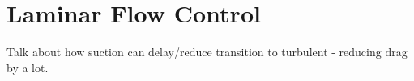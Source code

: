 \section{Laminar Flow Control}

Talk about how suction can delay/reduce transition to turbulent - reducing drag by a lot.